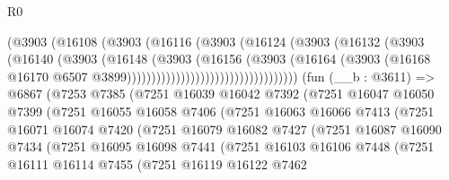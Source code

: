 \begin{lexlean}{R0}
\begin{coremodule}
                                      (@3903
                                        (@16108
                                          (@3903
                                            (@16116
                                              (@3903
                                                (@16124
                                                  (@3903
                                                    (@16132
                                                      (@3903
                                                        (@16140
                                                          (@3903
                                                            (@16148
                                                              (@3903
                                                                (@16156
                                                                  (@3903
                                                                    (@16164
                                                                      (@3903
                                                                        (@16168
                                                                          @16170
                                                                          @6507
                                                                          @3899)))))))))))))))))))))))))))))))))))
    (fun (__b : @3611) =>
    @6867
      (@7253
        @7385
        (@7251
          @16039
          @16042
          @7392
          (@7251
            @16047
            @16050
            @7399
            (@7251
              @16055
              @16058
              @7406
              (@7251
                @16063
                @16066
                @7413
                (@7251
                  @16071
                  @16074
                  @7420
                  (@7251
                    @16079
                    @16082
                    @7427
                    (@7251
                      @16087
                      @16090
                      @7434
                      (@7251
                        @16095
                        @16098
                        @7441
                        (@7251
                          @16103
                          @16106
                          @7448
                          (@7251
                            @16111
                            @16114
                            @7455
                            (@7251
                              @16119
                              @16122
                              @7462

\end{coremodule}
\end{lexlean}
